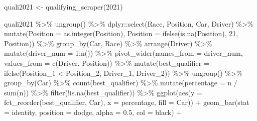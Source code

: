\documentclass[
]{book}
\newenvironment{Shaded}{\begin{snugshade}}{\end{snugshade}}
\newcommand{\AttributeTok}[1]{\textcolor[rgb]{0.77,0.63,0.00}{#1}}
\newcommand{\DecValTok}[1]{\textcolor[rgb]{0.00,0.00,0.81}{#1}}
\newcommand{\FloatTok}[1]{\textcolor[rgb]{0.00,0.00,0.81}{#1}}
\newcommand{\FunctionTok}[1]{\textcolor[rgb]{0.00,0.00,0.00}{#1}}
\newcommand{\NormalTok}[1]{#1}
\newcommand{\OtherTok}[1]{\textcolor[rgb]{0.56,0.35,0.01}{#1}}
\newcommand{\SpecialCharTok}[1]{\textcolor[rgb]{0.00,0.00,0.00}{#1}}
\newcommand{\StringTok}[1]{\textcolor[rgb]{0.31,0.60,0.02}{#1}}
\begin{document}
\begin{Shaded}
\begin{Highlighting}[]
\NormalTok{quali2021 }\OtherTok{\textless{}{-}} \FunctionTok{qualifying\_scraper}\NormalTok{(}\DecValTok{2021}\NormalTok{)}

\NormalTok{quali2021 }\SpecialCharTok{\%\textgreater{}\%}
  \FunctionTok{ungroup}\NormalTok{() }\SpecialCharTok{\%\textgreater{}\%}
\NormalTok{  dplyr}\SpecialCharTok{::}\FunctionTok{select}\NormalTok{(Race, Position, Car, Driver) }\SpecialCharTok{\%\textgreater{}\%}
  \FunctionTok{mutate}\NormalTok{(}\AttributeTok{Position =} \FunctionTok{as.integer}\NormalTok{(Position),}
         \AttributeTok{Position =} \FunctionTok{ifelse}\NormalTok{(}\FunctionTok{is.na}\NormalTok{(Position), }\DecValTok{21}\NormalTok{, Position)) }\SpecialCharTok{\%\textgreater{}\%} 
  \FunctionTok{group\_by}\NormalTok{(Car, Race) }\SpecialCharTok{\%\textgreater{}\%} 
  \FunctionTok{arrange}\NormalTok{(Driver) }\SpecialCharTok{\%\textgreater{}\%} 
  \FunctionTok{mutate}\NormalTok{(}\AttributeTok{driver\_num =} \DecValTok{1}\SpecialCharTok{:}\FunctionTok{n}\NormalTok{()) }\SpecialCharTok{\%\textgreater{}\%} 
  \FunctionTok{pivot\_wider}\NormalTok{(}\AttributeTok{names\_from =} \StringTok{\textquotesingle{}driver\_num\textquotesingle{}}\NormalTok{, }\AttributeTok{values\_from =} \FunctionTok{c}\NormalTok{(}\StringTok{\textquotesingle{}Driver\textquotesingle{}}\NormalTok{, }\StringTok{\textquotesingle{}Position\textquotesingle{}}\NormalTok{)) }\SpecialCharTok{\%\textgreater{}\%}
  \FunctionTok{mutate}\NormalTok{(}\AttributeTok{best\_qualifier =} \FunctionTok{ifelse}\NormalTok{(Position\_1 }\SpecialCharTok{\textless{}}\NormalTok{ Position\_2, Driver\_1, Driver\_2)) }\SpecialCharTok{\%\textgreater{}\%}
  \FunctionTok{ungroup}\NormalTok{() }\SpecialCharTok{\%\textgreater{}\%}
  \FunctionTok{group\_by}\NormalTok{(Car) }\SpecialCharTok{\%\textgreater{}\%}
  \FunctionTok{count}\NormalTok{(best\_qualifier) }\SpecialCharTok{\%\textgreater{}\%}
  \FunctionTok{mutate}\NormalTok{(}\AttributeTok{percentage =}\NormalTok{ n }\SpecialCharTok{/} \FunctionTok{sum}\NormalTok{(n)) }\SpecialCharTok{\%\textgreater{}\%}
  \FunctionTok{filter}\NormalTok{(}\SpecialCharTok{!}\FunctionTok{is.na}\NormalTok{(best\_qualifier)) }\SpecialCharTok{\%\textgreater{}\%}
  \FunctionTok{ggplot}\NormalTok{(}\FunctionTok{aes}\NormalTok{(}\AttributeTok{y =} \FunctionTok{fct\_reorder}\NormalTok{(best\_qualifier, Car), }\AttributeTok{x =}\NormalTok{ percentage, }\AttributeTok{fill =}\NormalTok{ Car)) }\SpecialCharTok{+}
  \FunctionTok{geom\_bar}\NormalTok{(}\AttributeTok{stat =} \StringTok{\textquotesingle{}identity\textquotesingle{}}\NormalTok{, }\AttributeTok{position =} \StringTok{\textquotesingle{}dodge\textquotesingle{}}\NormalTok{, }\AttributeTok{alpha =} \FloatTok{0.5}\NormalTok{, }\AttributeTok{col =} \StringTok{\textquotesingle{}black\textquotesingle{}}\NormalTok{) }\SpecialCharTok{+}

\end{Highlighting}
\end{Shaded}
\end{document}
